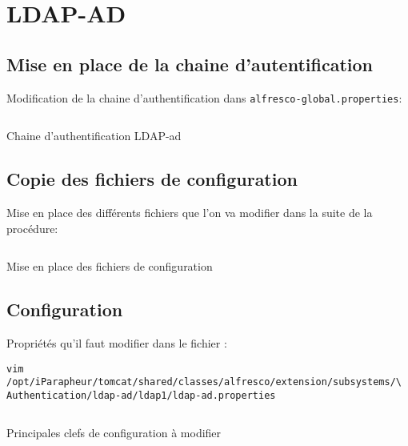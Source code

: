 \section{LDAP-AD}
\subsection{Mise en place de la chaine d'autentification}
Modification de la chaine d'authentification dans \verb|alfresco-global.properties|:
\begin{codesnippet}
\inputminted[frame=single,fontsize=\footnotesize]{properties}{extraits/authchain_autocreate.properties}

\caption{Chaine d'authentification LDAP-ad}
\label{conf:ldap-ad-auth-chain}
\end{codesnippet}

\subsection{Copie des fichiers de configuration}
Mise en place des différents fichiers que l'on va modifier dans la suite de la procédure:

\begin{codesnippet}
\inputminted[frame=single,linenos,fontsize=\footnotesize]{bash}{extraits/enable_ldap1.sh}
\caption{Mise en place des fichiers de configuration}
\label{conf:ldap-ad-files}
\end{codesnippet}

\subsection{Configuration}
Propriétés qu'il faut modifier dans le fichier : 
\begin{verbatim}
vim /opt/iParapheur/tomcat/shared/classes/alfresco/extension/subsystems/\
Authentication/ldap-ad/ldap1/ldap-ad.properties
\end{verbatim}

\begin{codesnippet}
\inputminted[frame=single,linenos,fontsize=\footnotesize]{properties}{extraits/main_keys.properties}
\caption{Principales clefs de configuration à modifier}
\label{conf:ldap-ad-main}
\end{codesnippet}

